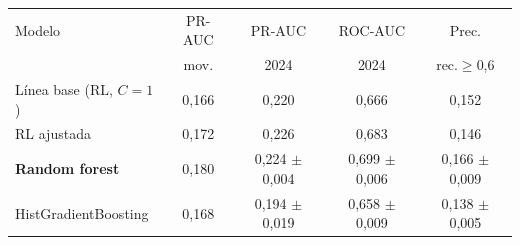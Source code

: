 \begin{tabular}{@{}lcccc@{}}
\toprule
Modelo & PR-AUC & PR-AUC & ROC-AUC & Prec. \\
 & mov. & 2024 & 2024 & rec.$\geq$0,6 \\
\midrule
{Línea base (RL, $C{=}1$)} & 0,166 & 0,220 & 0,666 & 0,152 \\
{RL ajustada} & 0,172 & 0,226 & 0,683 & 0,146 \\
\textbf{Random forest} & 0,180 & 0,224 $\pm$ 0,004 & 0,699 $\pm$ 0,006 & 0,166 $\pm$ 0,009 \\
{HistGradientBoosting} & 0,168 & 0,194 $\pm$ 0,019 & 0,658 $\pm$ 0,009 & 0,138 $\pm$ 0,005 \\
\bottomrule
\end{tabular}
